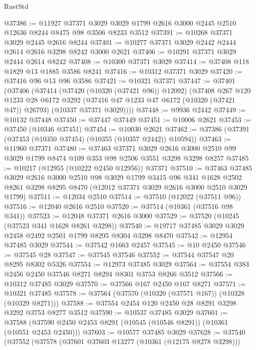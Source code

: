 \begin{lexlean}{RustStd}
\begin{coremodule}
@37386 := @11927
    @37371
    @3029
    @3029
    @1799
    @2616
    @3000
    @2445
    @2510
    @12636
    @8244
    @8475
    @98
    @3506
    @8233
    @3512
@37391 := @10268 @37371 @3029 @2445 @2616 @8244
@37401 := @10277 @37371 @3029 @2442 @2444 @2614 @2616 @3298 @8242 @3000 @2621
@37406 := @10291 @37371 @3029 @2444 @2614 @8242
@37408 := @10300 @37371 @3029
@37414 := @37408 @118 @1829 @13 @1885 @3586 @8241
@37416 := @10312 @37371 @3029
@37420 := @37416 @96 @13 @96 @3586
@37421 := @10321 @37371
@37447 := @37401
    (@37406
      (@37414
        (@37420 (@10320 (@37421 @96)) @12092)
        (@37408
          @267
          @120
          @1233
          @28
          @6172
          @3292
          (@37416 @47 @1233 @47 @6172 (@10320 (@37421 @47)) @26793)
          (@10337 @37371 @3029))))
@37448 := @9936 @2442
@37449 := @10132 @37448
@37450 := @37447 @37449
@37451 := @10006 @2621
@37453 := @37450 (@10346 @37451)
@37454 := @10030 @2621
@37462 := @37386 (@37391 (@37453 (@10350 @37454) (@10355 (@10357 @2442)) @10594))
@37463 := @11960 @37371
@37480 := @37463
    @37371
    @3029
    @2616
    @3000
    @2510
    @99
    @3029
    @1799
    @8474
    @109
    @353
    @98
    @2506
    @3551
    @3298
    @3298
    @8257
@37485 := @10217 (@12955 (@10222 @2450 @12956)) @37371
@37510 := @37463
    @37485
    @3029
    @2616
    @3000
    @2510
    @98
    @3029
    @1799
    @3415
    @96
    @341
    @1628
    @2502
    @8261
    @3298
    @8295
    @8470
    (@12012 @37371 @3029 @2616 @3000 @2510 @3029 @1799)
@37511 := @12034 @2510
@37514 := @37510 (@12022 (@37511 @96))
@37516 := @12040 @2616 @2510
@37520 := @37514 (@10361 (@37516 @98 @341))
@37523 := @12048 @37371 @2616 @3000
@37529 := @37520 (@10245 (@37523 @341 @1628 @8261 @3298))
@37540 := @19717 @37485 @3029 @3029 @2458 @2492 @2501 @1799 @8295 @8304 @3298 @8470
@37542 := @12954 @37485 @3029
@37544 := @37542 @1663 @2457
@37545 := @10 @2450
@37546 := @37545 @28
@37547 := @37545 @37546
@37552 := @37544 @37547 @20 @8295 @8302 @5326
@37554 := @12973 @37485 @3029
@37564 := @37554 @383 @2456 @2450 @37546 @8271 @8294 @8301 @3753 @8266 @3512
@37566 := @10312 @37485 @3029
@37570 := @37566 @167 @2450 @167 @8271
@37571 := @10321 @37485
@37578 := @37564 (@37570 (@10320 (@37571 @167)) (@10328 (@10329 @8271)))
@37588 := @37554 @2454 @120 @2450 @28 @8291 @3298 @3292 @3753 @8277 @3512
@37590 := @10537 @37485 @3029
@37601 := @37588 (@37590 @2450 @2453 @8291 (@10545 (@10546 @8291)) (@10361 (@10551 @2453 @2450)))
@37603 := @10577 @37485 @3029
@37628 := @37540
    (@37552
      (@37578
        (@37601 @37603 @13277 (@10361 (@12175 @8278 @3298)))

\end{coremodule}
\end{lexlean}
